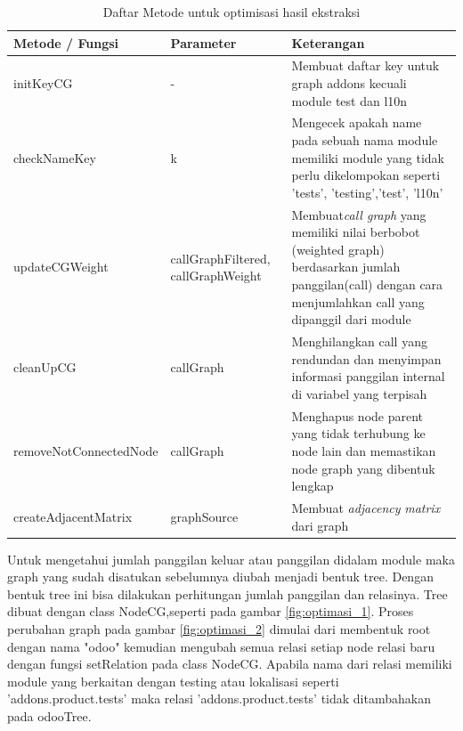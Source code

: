 \begingroup
\setlength{\LTleft}{-20cm plus -1fill}
\setlength{\LTright}{\LTleft}
\begin{small}
	\begin{longtable}{|p{4cm}|p{3cm}|p{6cm}|}
		\caption{Daftar Metode untuk optimisasi hasil ekstraksi}\\
		\hline
		\textbf{Metode / Fungsi} & \textbf{Parameter} & \textbf{Keterangan}\\
		\endfirsthead
		
		 \hline
		 initKeyCG
			& -
		 & Membuat daftar key untuk graph addons kecuali module test dan l10n  \\
		 
		 \hline
		 checkNameKey		 
			& k
		 & Mengecek apakah name pada sebuah nama module memiliki module yang tidak perlu dikelompokan seperti 'tests', 'testing','test', 'l10n' \\

		 \hline
		 updateCGWeight
		& callGraphFiltered, callGraphWeight
		 & Membuat\textit{call graph} yang memiliki nilai berbobot (weighted graph) berdasarkan jumlah panggilan(call) dengan cara menjumlahkan call yang dipanggil dari module \\

		 
		 \hline 
		 cleanUpCG
			& callGraph
		 & Menghilangkan call yang rendundan dan  menyimpan informasi panggilan internal di variabel yang terpisah\\

		 \hline
		 removeNotConnectedNode
		& callGraph
		 & Menghapus node parent yang tidak terhubung ke node lain  dan memastikan node graph yang dibentuk lengkap\\
		

		 \hline  
		createAdjacentMatrix
		& graphSource
		 & Membuat \textit{adjacency} \textit{matrix} dari graph  \\
		
		 \hline  
		 
	\end{longtable}
\end{small}
\endgroup

Untuk mengetahui jumlah panggilan keluar atau panggilan didalam module maka graph yang sudah disatukan sebelumnya diubah menjadi bentuk tree. Dengan bentuk tree ini bisa dilakukan perhitungan jumlah panggilan dan relasinya. Tree dibuat dengan class NodeCG,seperti pada gambar \ref{fig:optimasi_1}. Proses perubahan graph pada gambar \ref{fig:optimasi_2} dimulai dari membentuk root dengan nama "odoo" kemudian mengubah semua relasi setiap node relasi baru dengan fungsi setRelation pada class NodeCG. Apabila nama dari relasi memiliki module yang berkaitan dengan testing atau lokalisasi seperti 'addons.product.tests' maka relasi 'addons.product.tests' tidak ditambahakan pada odooTree. 

